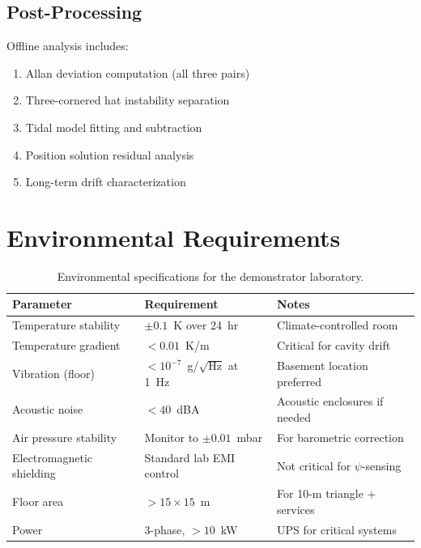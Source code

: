 \documentclass[12pt,letterpaper]{article}
\begin{document}
\subsection{Post-Processing}

Offline analysis includes:
\begin{enumerate}
\item Allan deviation computation (all three pairs)
\item Three-cornered hat instability separation
\item Tidal model fitting and subtraction
\item Position solution residual analysis
\item Long-term drift characterization
\end{enumerate}

\section{Environmental Requirements}

\begin{table}[h]
\centering
\caption{Environmental specifications for the demonstrator laboratory.}
\label{tab:environment}
\begin{tabular}{@{}lll@{}}
\toprule
Parameter & Requirement & Notes \\
\midrule
Temperature stability & $\pm 0.1$~K over 24~hr & Climate-controlled room \\
Temperature gradient & $< 0.01$~K/m & Critical for cavity drift \\
Vibration (floor) & $< 10^{-7}$~g/$\sqrt{\text{Hz}}$ at 1~Hz & Basement location preferred \\
Acoustic noise & $< 40$~dBA & Acoustic enclosures if needed \\
Air pressure stability & Monitor to $\pm 0.01$~mbar & For barometric correction \\
Electromagnetic shielding & Standard lab EMI control & Not critical for $\psi$-sensing \\
Floor area & $> 15\times15$~m & For 10-m triangle + services \\
Power & 3-phase, $> 10$~kW & UPS for critical systems \\
\bottomrule
\end{tabular}
\end{table}
\end{document}
